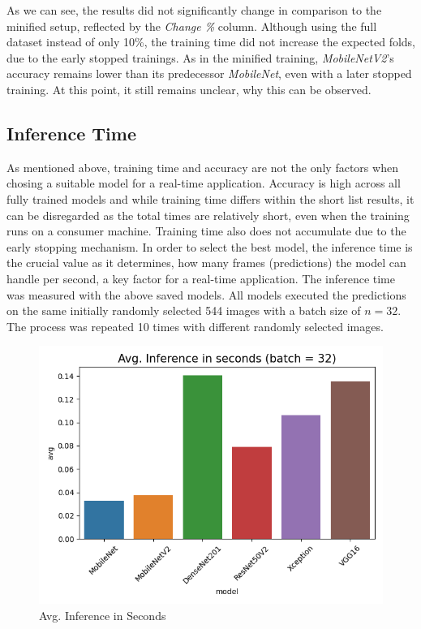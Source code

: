 As we can see, the results did not significantly change in comparison to the minified setup, reflected by the \textit{Change \%} column. Although using the full dataset instead of only 10\%, the training time did not increase the expected folds, due to the early stopped trainings. As in the minified training, \textit{MobileNetV2}'s accuracy remains lower than its predecessor \textit{MobileNet}, even with a later stopped training. At this point, it still remains unclear, why this can be observed.

\subsection{Inference Time}
As mentioned above, training time and accuracy are not the only factors when chosing a suitable model for a real-time application. Accuracy is high across all fully trained models and while training time differs within the short list results, it can be disregarded as the total times are relatively short, even when the training runs on a consumer machine. Training time also does not accumulate due to the early stopping mechanism. In order to select the best model, the inference time is the crucial value as it determines, how many frames (predictions) the model can handle per second, a key factor for a real-time application.
The inference time was measured with the above saved models. All models executed the predictions on the same initially randomly selected 544 images with a batch size of \begin{math}n=32\end{math}. The process was repeated 10 times with different randomly selected images.

\begin{figure}[h]
    \centering
    \caption{Avg. Inference in Seconds}
	\label{fig:result:inference}
    \includegraphics[width=\linewidth]{figures/inference.png}
\end{figure}

